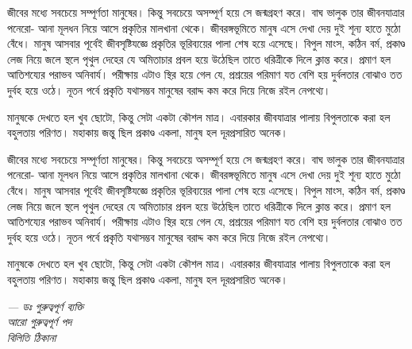 জীবের মধ্যে সবচেয়ে সম্পূর্ণতা মানুষের। কিন্তু সবচেয়ে অসম্পূর্ণ হয়ে সে জন্মগ্রহণ করে। বাঘ ভালুক তার জীবনযাত্রার পনেরো- আনা মূলধন নিয়ে আসে প্রকৃতির মালখানা থেকে। জীবরঙ্গভূমিতে মানুষ এসে দেখা দেয় দুই শূন্য হাতে মুঠো বেঁধে।
মানুষ আসবার পূর্বেই জীবসৃষ্টিযজ্ঞে প্রকৃতির ভূরিব্যয়ের পালা শেষ হয়ে এসেছে। বিপুল মাংস, কঠিন বর্ম, প্রকাণ্ড লেজ নিয়ে জলে স্থলে পৃথুল দেহের যে অমিতাচার প্রবল হয়ে উঠেছিল তাতে ধরিত্রীকে দিলে ক্লান্ত করে। প্রমাণ হল আতিশয্যের পরাভব অনিবার্য। পরীক্ষায় এটাও স্থির হয়ে গেল যে, প্রশ্রয়ের পরিমাণ যত বেশি হয় দুর্বলতার বোঝাও তত দুর্বহ হয়ে ওঠে। নূতন পর্বে প্রকৃতি যথাসম্ভব মানুষের বরাদ্দ কম করে দিয়ে নিজে রইল নেপথ্যে।

মানুষকে দেখতে হল খুব ছোটো, কিন্তু সেটা একটা কৌশল মাত্র। এবারকার জীবযাত্রার পালায় বিপুলতাকে করা হল বহুলতায় পরিণত। মহাকায় জন্তু ছিল প্রকাণ্ড একলা, মানুষ হল দূরপ্রসারিত অনেক।

জীবের মধ্যে সবচেয়ে সম্পূর্ণতা মানুষের। কিন্তু সবচেয়ে অসম্পূর্ণ হয়ে সে জন্মগ্রহণ করে। বাঘ ভালুক তার জীবনযাত্রার পনেরো- আনা মূলধন নিয়ে আসে প্রকৃতির মালখানা থেকে। জীবরঙ্গভূমিতে মানুষ এসে দেখা দেয় দুই শূন্য হাতে মুঠো বেঁধে।
মানুষ আসবার পূর্বেই জীবসৃষ্টিযজ্ঞে প্রকৃতির ভূরিব্যয়ের পালা শেষ হয়ে এসেছে। বিপুল মাংস, কঠিন বর্ম, প্রকাণ্ড লেজ নিয়ে জলে স্থলে পৃথুল দেহের যে অমিতাচার প্রবল হয়ে উঠেছিল তাতে ধরিত্রীকে দিলে ক্লান্ত করে। প্রমাণ হল আতিশয্যের পরাভব অনিবার্য। পরীক্ষায় এটাও স্থির হয়ে গেল যে, প্রশ্রয়ের পরিমাণ যত বেশি হয় দুর্বলতার বোঝাও তত দুর্বহ হয়ে ওঠে। নূতন পর্বে প্রকৃতি যথাসম্ভব মানুষের বরাদ্দ কম করে দিয়ে নিজে রইল নেপথ্যে।

মানুষকে দেখতে হল খুব ছোটো, কিন্তু সেটা একটা কৌশল মাত্র। এবারকার জীবযাত্রার পালায় বিপুলতাকে করা হল বহুলতায় পরিণত। মহাকায় জন্তু ছিল প্রকাণ্ড একলা, মানুষ হল দূরপ্রসারিত অনেক।

\begin{flushright}
	\textit{\small — ডঃ গুরুত্বপূর্ণ ব্যক্তি\\
		আরো গুরুত্বপূর্ণ পদ\\
		বিলিতি ঠিকানা}
\end{flushright}